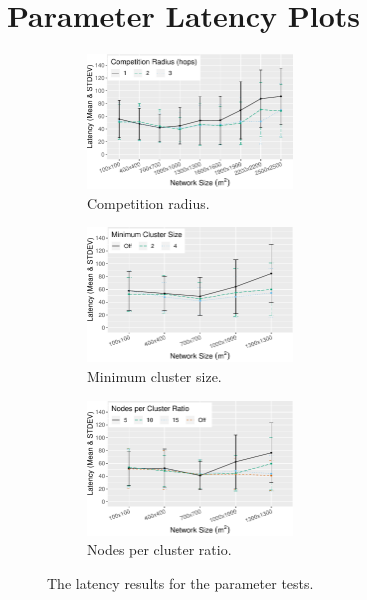 \section{Parameter Latency Plots}
\begin{figure}[H]
    
\centering
\begin{subfigure}{\textwidth}
    \centering
    \includegraphics[width=0.60\textwidth, keepaspectratio]{figure/Results/ParameterEvaluation/CompetitionRadius_Latency.pdf}
    \caption{Competition radius.}
    \label{subfig:competition-radius-latency}
\end{subfigure}
\begin{subfigure}{\textwidth}
    \centering
    \includegraphics[width=0.60\textwidth, keepaspectratio]{figure/Results/ParameterEvaluation/MinNodeCount_Latency.pdf}
    \caption{Minimum cluster size.}
    \label{subfig:min-node-count-latency}
\end{subfigure}
\begin{subfigure}{\textwidth}
    \centering
    \includegraphics[width=0.60\textwidth, keepaspectratio]{figure/Results/ParameterEvaluation/MaxNodeCount_Latency.pdf}
    \caption{Nodes per cluster ratio.}
    \label{subfig:max-node-count-latency}
\end{subfigure}

    \caption{The latency results for the parameter tests.}
    \label{fig:parameter-tests-latency}
\end{figure}

